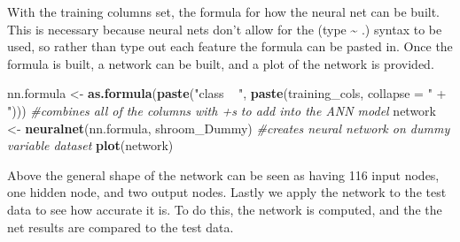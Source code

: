 \documentclass[
  english,
  man]{apa6}
\newenvironment{Shaded}{\begin{snugshade}}{\end{snugshade}}
\newcommand{\CommentTok}[1]{\textcolor[rgb]{0.56,0.35,0.01}{\textit{#1}}}
\newcommand{\DataTypeTok}[1]{\textcolor[rgb]{0.13,0.29,0.53}{#1}}
\newcommand{\FloatTok}[1]{\textcolor[rgb]{0.00,0.00,0.81}{#1}}
\newcommand{\KeywordTok}[1]{\textcolor[rgb]{0.13,0.29,0.53}{\textbf{#1}}}
\newcommand{\NormalTok}[1]{#1}
\newcommand{\OperatorTok}[1]{\textcolor[rgb]{0.81,0.36,0.00}{\textbf{#1}}}
\newcommand{\OtherTok}[1]{\textcolor[rgb]{0.56,0.35,0.01}{#1}}
\newcommand{\StringTok}[1]{\textcolor[rgb]{0.31,0.60,0.02}{#1}}
\begin{document}
\begin{Shaded}
\end{Shaded}

With the training columns set, the formula for how the neural net can be built. This is necessary because neural nets don't allow for the (type \textasciitilde{} .) syntax to be used, so rather than type out each feature the formula can be pasted in. Once the formula is built, a network can be built, and a plot of the network is provided.

\begin{Shaded}
\begin{Highlighting}[]
\NormalTok{nn.formula <-}\StringTok{ }\KeywordTok{as.formula}\NormalTok{(}\KeywordTok{paste}\NormalTok{(}\StringTok{"class ~ "}\NormalTok{, }\KeywordTok{paste}\NormalTok{(training_cols, }\DataTypeTok{collapse =} \StringTok{" + "}\NormalTok{))) }\CommentTok{#combines all of the columns with +s to add into the ANN model}
\NormalTok{network <-}\StringTok{ }\KeywordTok{neuralnet}\NormalTok{(nn.formula, shroom_Dummy) }\CommentTok{#creates neural network on dummy variable dataset}
\KeywordTok{plot}\NormalTok{(network)}
\end{Highlighting}
\end{Shaded}

Above the general shape of the network can be seen as having 116 input nodes, one hidden node, and two output nodes. Lastly we apply the network to the test data to see how accurate it is. To do this, the network is computed, and the the net results are compared to the test data.
\end{document}
